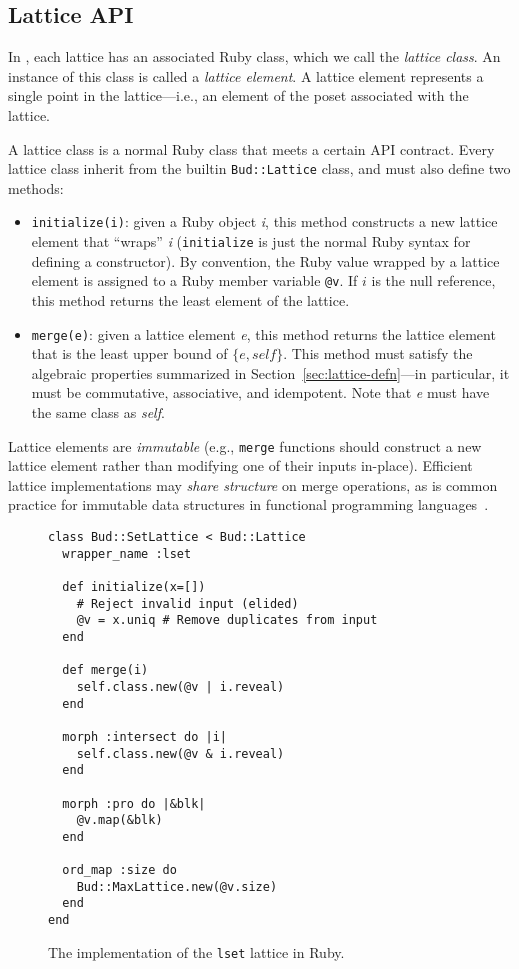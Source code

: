 \subsection{Lattice API}
\label{sec:lattice-api}
In \lang, each lattice has an associated Ruby class, which we call the
\emph{lattice class}. An instance of this class is called a \emph{lattice
  element}. A lattice element represents a single point in the lattice---i.e., an
element of the poset associated with the lattice.

A lattice class is a normal Ruby class that meets a certain API contract. Every
lattice class inherit from the builtin \texttt{Bud::Lattice} class, and
must also define two methods:
\begin{itemize}
\item \texttt{initialize(i)}: given a Ruby object \emph{i}, this method
  constructs a new lattice element that ``wraps'' \emph{i} (\texttt{initialize}
  is just the normal Ruby syntax for defining a constructor). By convention, the
  Ruby value wrapped by a lattice element is assigned to a Ruby member variable
  \texttt{@v}. If $i$ is the null reference, this method returns the least
  element of the lattice.

\item \texttt{merge(e)}: given a lattice element \emph{e}, this method returns the
  lattice element that is the least upper bound of $\{e, \textit{self}\}$. This method must
  satisfy the algebraic properties summarized in Section~\ref{sec:lattice-defn}---in
  particular, it must be commutative, associative, and idempotent. Note that
  \emph{e} must have the same class as \emph{self}.
\end{itemize}
Lattice elements are \emph{immutable} (e.g., \texttt{merge} functions should
construct a new lattice element rather than modifying one of their inputs
in-place). Efficient lattice implementations may \emph{share structure} on merge
operations, as is common practice for immutable data structures in functional
programming languages~\cite{Okasaki1999}. %

\begin{figure}[t]
\begin{scriptsize}
\begin{lstlisting}
class Bud::SetLattice < Bud::Lattice
  wrapper_name :lset

  def initialize(x=[])
    # Reject invalid input (elided)
    @v = x.uniq # Remove duplicates from input
  end

  def merge(i)
    self.class.new(@v | i.reveal)
  end

  morph :intersect do |i|
    self.class.new(@v & i.reveal)
  end

  morph :pro do |&blk|
    @v.map(&blk)
  end

  ord_map :size do
    Bud::MaxLattice.new(@v.size)
  end
end
\end{lstlisting}
\end{scriptsize}
\caption{The implementation of the \texttt{lset} lattice in Ruby.}
\label{fig:lattice-set}
\end{figure}


